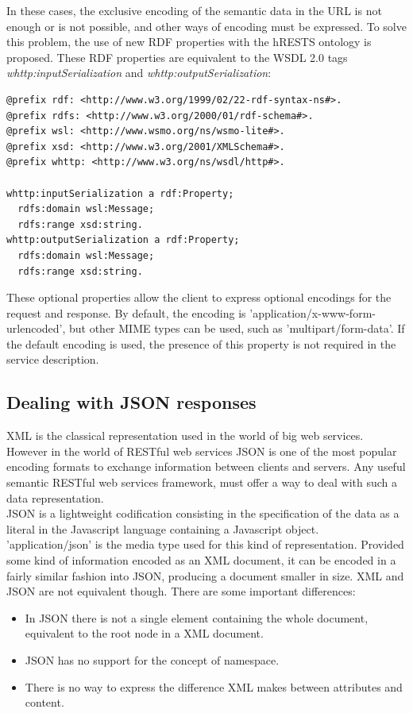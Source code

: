 In these cases, the exclusive encoding of the semantic data in the URL is not enough or is not possible, and other ways of encoding must be expressed. To solve this problem, the use of new RDF properties with the hRESTS ontology is proposed. These RDF properties are equivalent to the WSDL 2.0 tags \emph{whttp:inputSerialization} and \emph{whttp:outputSerialization}:
\vspace{5 mm}
\begin{lstlisting}
@prefix rdf: <http://www.w3.org/1999/02/22-rdf-syntax-ns#>. 
@prefix rdfs: <http://www.w3.org/2000/01/rdf-schema#>. 
@prefix wsl: <http://www.wsmo.org/ns/wsmo-lite#>. 
@prefix xsd: <http://www.w3.org/2001/XMLSchema#>. 
@prefix whttp: <http://www.w3.org/ns/wsdl/http#>.
 
whttp:inputSerialization a rdf:Property;
  rdfs:domain wsl:Message;
  rdfs:range xsd:string.
whttp:outputSerialization a rdf:Property;
  rdfs:domain wsl:Message;
  rdfs:range xsd:string.
\end{lstlisting} \vspace{5 mm}

These optional properties allow the client to express optional encodings for the request and response. By default, the encoding is 'application/x-www-form-urlencoded', but other MIME types can be used, such as 'multipart/form-data'. If the default encoding is used, the presence of this property is not required in the service description.

\subsection{Dealing with JSON responses}
XML is the classical representation used in the world of big web services. However in the world of RESTful web services JSON is one of the most popular encoding formats to exchange information between clients and servers. Any useful semantic RESTful web services framework, must offer a way to deal with such a data representation.\\
JSON is a lightweight codification consisting in the specification of the data as a literal in the Javascript language containing a Javascript object. 'application/json' is the media type used for this kind of representation. Provided some kind of information encoded as an XML document, it can be encoded in a fairly similar fashion into JSON, producing a document smaller in size. XML and JSON are not equivalent though. There are some important differences:

\begin{itemize}
  \item In JSON there is not a single element containing the whole document, equivalent to the root node in a XML document.
  \item JSON has no support for the concept of namespace.
  \item There is no way to express the difference XML makes between attributes and content.
\end{itemize}

